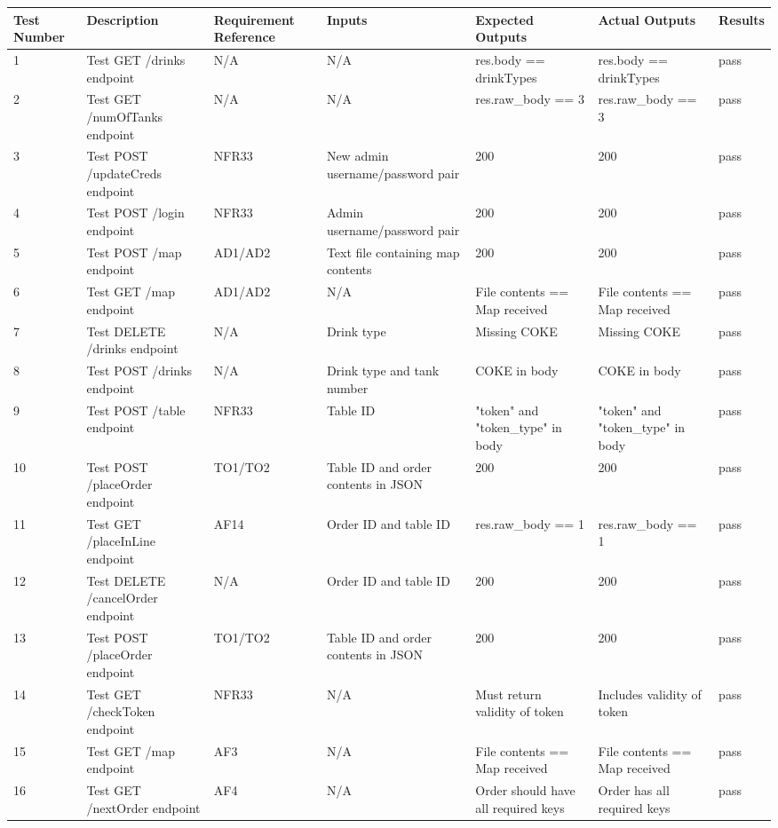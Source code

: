 \documentclass [10pt]{article}
\begin{document}
\begin{longtable}{| p{} | p{} | p{} | p{} | p{} | p{} | p{} |}\hline 
	\rowcolor{tableCell}\textbf{Test Number} & \textbf{Description} & \textbf{Requirement Reference} & \textbf{Inputs} & \textbf{Expected Outputs} & \textbf{Actual Outputs}& \textbf{Results} \\ \hline

1 &  Test GET /drinks endpoint & N/A  &  N/A &  res.body == drinkTypes &  res.body == drinkTypes &  pass
\\ \hline  
2 &  Test GET /numOfTanks endpoint & N/A  &  N/A &  res.raw\_body == 3 &  res.raw\_body == 3 &  pass
\\ \hline  
3 &  Test POST /updateCreds endpoint &  NFR33 &  New admin username/password pair &  200 &  200 &  pass
\\ \hline  
4 &  Test POST /login endpoint &  NFR33 &  Admin username/password pair &  200 &  200 &  pass
\\ \hline  
5 &  Test POST /map endpoint &  AD1/AD2 &  Text file containing map contents &  200 &  200 &  pass
\\ \hline  
6 &  Test GET /map endpoint &  AD1/AD2 &  N/A &  File contents == Map received &  File contents == Map received &  pass
\\ \hline  
7 &  Test DELETE /drinks endpoint & N/A  &  Drink type &  Missing COKE &  Missing COKE &  pass
\\ \hline  
8 &  Test POST /drinks endpoint & N/A  &  Drink type and tank number &  COKE in body &  COKE in body &  pass
\\ \hline  
9 &  Test POST /table endpoint &  NFR33 &  Table ID &  "token" and "token\_type" in body &  "token" and "token\_type" in body &  pass
\\ \hline  
10 &  Test POST /placeOrder endpoint &  TO1/TO2 &  Table ID and order contents in JSON &  200 &  200 &  pass
\\ \hline  
11 &  Test GET /placeInLine endpoint &  AF14 &  Order ID and table ID &  res.raw\_body == 1 &  res.raw\_body == 1 &  pass
\\ \hline  
12 &  Test DELETE /cancelOrder endpoint & N/A  &  Order ID and table ID &  200 &  200 &  pass
\\ \hline  
13 &  Test POST /placeOrder endpoint &  TO1/TO2 &  Table ID and order contents in JSON &  200 &  200 &  pass
\\ \hline  
14 &  Test GET /checkToken endpoint &  NFR33 &  N/A &  Must return validity of token &  Includes validity of token &  pass
\\ \hline  
15 &  Test GET /map endpoint &  AF3 &  N/A &  File contents == Map received &  File contents == Map received &  pass
\\ \hline  
16 &  Test GET /nextOrder endpoint &  AF4 &  N/A &  Order should have all required keys &  Order has all required keys &  pass \\ \hline  
\end{longtable}
\end{document}

